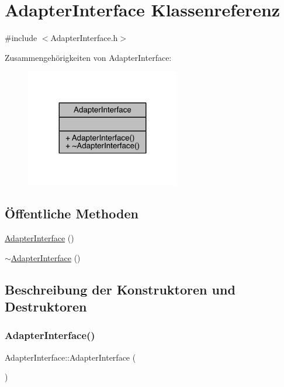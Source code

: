 \hypertarget{class_adapter_interface}{}\section{Adapter\+Interface Klassenreferenz}
\label{class_adapter_interface}


{\ttfamily \#include $<$Adapter\+Interface.\+h$>$}



Zusammengehörigkeiten von Adapter\+Interface\+:
\nopagebreak
\begin{figure}[H]
\begin{center}
\leavevmode
\includegraphics[width=191pt]{class_adapter_interface__coll__graph}
\end{center}
\end{figure}
\subsection*{Öffentliche Methoden}
\begin{DoxyCompactItemize}
\item 
\hyperlink{class_adapter_interface_a9e247d78e84be9d3cb3c3a2dfc93dc6e}{Adapter\+Interface} ()
\item 
\hyperlink{class_adapter_interface_a1b1ab479bdaba7c80831d7bb950be7f5}{$\sim$\+Adapter\+Interface} ()
\end{DoxyCompactItemize}


\subsection{Beschreibung der Konstruktoren und Destruktoren}
\hypertarget{class_adapter_interface_a9e247d78e84be9d3cb3c3a2dfc93dc6e}{}\label{class_adapter_interface_a9e247d78e84be9d3cb3c3a2dfc93dc6e} 
\subsubsection{\texorpdfstring{Adapter\+Interface()}{AdapterInterface()}}
{\footnotesize\ttfamily Adapter\+Interface\+::\+Adapter\+Interface (\begin{DoxyParamCaption}{ }\end{DoxyParamCaption})}

